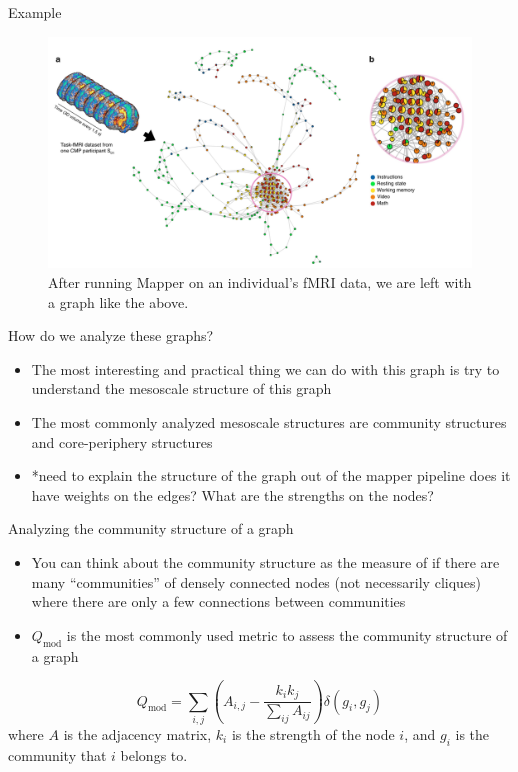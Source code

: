 \documentclass{beamer}
\begin{document}
\begin{frame}{Example}
    \begin{figure}
        \includegraphics[width = 0.8\linewidth]{fig2.png}
        \caption{After running Mapper on an individual's fMRI data, we are left with a graph like the above. }
    \end{figure}
\end{frame}

\begin{frame}{How do we analyze these graphs?}
    \begin{itemize}
        \item The most interesting and practical thing we can do with this graph is try to understand the mesoscale structure of this graph \pause
        \item The most commonly analyzed mesoscale structures are community structures and core-periphery structures \pause
        \item *need to explain the structure of the graph out of the mapper pipeline does it have weights on the edges? What are the strengths on the nodes?
    \end{itemize}
\end{frame}

\begin{frame}{Analyzing the community structure of a graph}
    \begin{itemize}
        \item You can think about the community structure as the measure of if there are many ``communities'' of densely connected nodes (not necessarily cliques) where there are only a few connections between communities \pause
        \item $Q_{\mathrm{mod}}$ is the most commonly used metric to assess the community structure of a graph\cite{community}
    \end{itemize}
    \[Q_{\mathrm{mod}} = \sum_{i,j} \left(A_{i,j} - \frac{k_i k_j}{\sum_{ij}A_{ij}}\right)\delta(g_i, g_j)\]
    where $A$ is the adjacency matrix, $k_i$ is the strength of the node $i$, and $g_i$ is the community that $i$ belongs to.
\end{frame}
\end{document}
